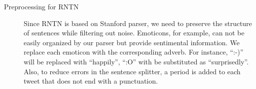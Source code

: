 \begin{description}
%

\item[Preprocessing for RNTN] Since RNTN is based on Stanford parser, we need to preserve the structure of sentences while filtering out noise. 
 Emoticons, for example, can not be easily organized by our parser but provide sentimental information. We replace each emoticon with the corresponding adverb. For instance, ``:-)'' will be replaced with ``happily'', ``:O'' with be substituted as ``surprisedly''.  Also, to reduce errors in the sentence splitter, a period is added to each tweet that does not end with a punctuation.


\end{description}


